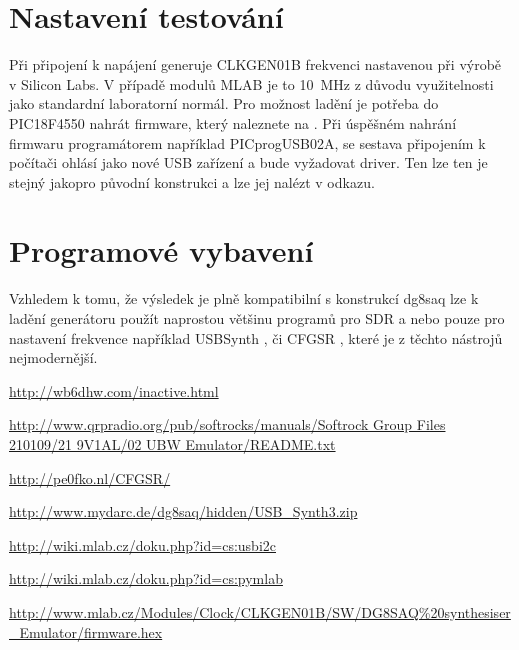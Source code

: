 \documentclass[12pt,a4paper,oneside]{article}
\begin{document}
\section{Nastavení testování}
Při připojení k napájení generuje CLKGEN01B frekvenci nastavenou při výrobě v Silicon Labs. V případě modulů MLAB je to 10~MHz z důvodu využitelnosti jako standardní laboratorní normál.  Pro možnost ladění je potřeba do PIC18F4550 nahrát firmware, který naleznete na \cite{pic_firmware}. Při úspěšném nahrání firmwaru programátorem například PICprogUSB02A, se sestava připojením k počítači ohlásí jako nové USB zařízení a bude vyžadovat driver. Ten lze ten je stejný jakopro původní konstrukci a lze jej nalézt v odkazu\cite{CFGSR}.

\section{Programové vybavení}
Vzhledem k tomu, že výsledek je plně kompatibilní s  konstrukcí dg8saq lze k ladění generátoru použít naprostou většinu programů pro SDR a nebo pouze pro nastavení frekvence například USBSynth \cite{USB_Synth}, či CFGSR \cite{CFGSR}, které je z těchto nástrojů nejmodernější.

\begin{thebibliography}{99}
\href{http://wb6dhw.com/inactive.html}{http://wb6dhw.com/inactive.html}

\href{http://www.qrpradio.org/pub/softrocks/manuals/Softrock Group Files 210109/21 9V1AL/02 UBW Emulator/README.txt}{http://www.qrpradio.org/pub/softrocks/manuals/Softrock Group Files 210109/21 9V1AL/02 UBW Emulator/README.txt}

\href{http://pe0fko.nl/CFGSR/}{http://pe0fko.nl/CFGSR/}

\href{ http://www.mydarc.de/dg8saq/hidden/USB\_Synth3.zip}{http://www.mydarc.de/dg8saq/hidden/USB\_Synth3.zip}

\href{http://wiki.mlab.cz/doku.php?id=cs:usbi2c}{http://wiki.mlab.cz/doku.php?id=cs:usbi2c}

\href{http://wiki.mlab.cz/doku.php?id=cs:pymlab}{http://wiki.mlab.cz/doku.php?id=cs:pymlab}

\href{http://www.mlab.cz/Modules/Clock/CLKGEN01B/SW/DG8SAQ\%20synthesiser\_Emulator/firmware.hex}{http://www.mlab.cz/Modules/Clock/CLKGEN01B/SW/DG8SAQ\%20synthesiser\_Emulator/firmware.hex}


\end{thebibliography}
\end{document}
